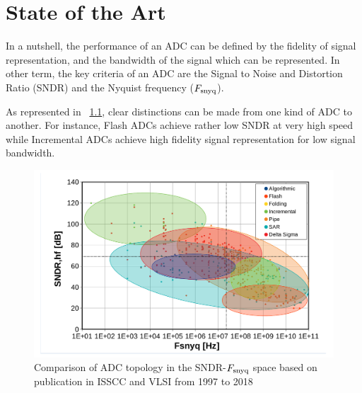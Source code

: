
\chapter{State of the Art}
\label{sec:soa}
\ifpdf
    \graphicspath{{Chapter2/Figs/Raster/}{Chapter2/Figs/PDF/}{Chapter2/Figs/}}
\else
    \graphicspath{{Chapter2/Figs/Vector/}{Chapter2/Figs/}}
\fi

In a nutshell, the performance of an ADC can be defined by the fidelity of signal representation, and the bandwidth of the signal which can be represented. In other term, the key criteria of an ADC are the Signal to Noise and Distortion Ratio (SNDR) and the Nyquist frequency ($F_{\rm snyq}$).

As represented in \figurename~\ref{fig:topology-sndr-fsnyq-comparison}, clear distinctions can be made from one kind of ADC to another. For instance, Flash ADCs achieve rather low SNDR at very high speed while Incremental ADCs achieve high fidelity signal representation for low signal bandwidth. 

\begin{figure}[htp]
    \centering
    \includegraphics[width=.8\textwidth]{Chapter2/Figs/Vector/sndr_fsnyq_topology.pdf}
    \caption{Comparison of ADC topology in the SNDR-$F_{\rm snyq}$ space based on publication in ISSCC and VLSI from 1997 to 2018}
    \label{fig:topology-sndr-fsnyq-comparison}
\end{figure}

